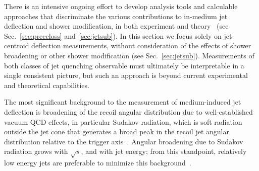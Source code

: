 There is an intensive ongoing effort to develop analysis tools and calculable approaches that discriminate the various contributions to in-medium jet deflection and shower modification, in both experiment and theory~\cite{Andrews:2018jcm} (see Sec.~\ref{sec:preceloss} and~\ref{sec:jetsub}). In this section we focus solely on jet-centroid deflection measurements, without consideration of the effects of shower broadening or other shower modification (see Sec.~\ref{sec:jetsub}). Measurements of both classes of jet quenching observable must ultimately be interpretable in a single consistent picture, but such an approach is beyond current experimental and theoretical capabilities. %

The most significant background to the measurement of medium-induced jet deflection is broadening of the recoil angular distribution due to well-established vacuum QCD effects, in particular Sudakov radiation, which is soft radiation outside the jet cone that generates a broad peak in the recoil jet angular distribution relative to the trigger axis~\cite{Chen:2016vem,Mueller:2016xoc}. Angular broadening due to Sudakov radiation grows with $\sqrt{s}$, and with jet energy; from this standpoint, relatively low energy jets are preferable to minimize this background~\cite{Chen:2016vem}.

